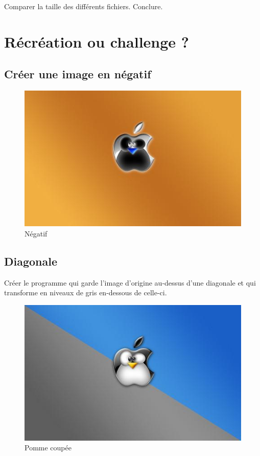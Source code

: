 \documentclass[11pt]{article}
\begin{document}
Comparer la taille des différents fichiers. Conclure.


\section{Récréation ou challenge ?}
\label{sec:orgc5abfdc}

\subsection{Créer une image en négatif}
\label{sec:org97f9b16}

\begin{figure}[htbp]
\centering
\includegraphics[width=.9\linewidth]{pommeNegatif.jpg}
\caption{Négatif}
\end{figure}

\subsection{Diagonale}
\label{sec:org28b4c9d}

Créer le programme qui garde l'image d'origine au-dessus d'une diagonale et qui transforme en niveaux de gris en-dessous de celle-ci.


\begin{figure}[htbp]
\centering
\includegraphics[width=.9\linewidth]{pommemisgrise.jpg}
\caption{Pomme coupée}
\end{figure}
\end{document}
